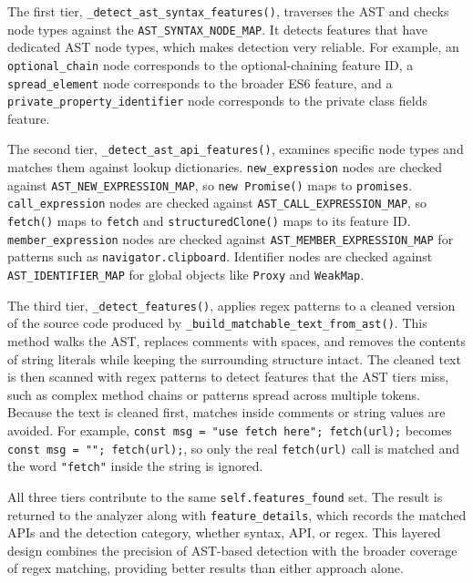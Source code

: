 The first tier, \texttt{\_detect\_ast\_syntax\_features()}, traverses the AST and checks node types against the \texttt{AST\_SYNTAX\_NODE\_MAP}. It detects features that have dedicated AST node types, which makes detection very reliable. For example, an \texttt{optional\_chain} node corresponds to the optional-chaining feature ID, a \texttt{spread\_element} node corresponds to the broader ES6 feature, and a \texttt{private\_property\_identifier} node corresponds to the private class fields feature.

The second tier, \texttt{\_detect\_ast\_api\_features()}, examines specific node types and matches them against lookup dictionaries. \texttt{new\_expression} nodes are checked against \texttt{AST\_NEW\_EXPRESSION\_MAP}, so \texttt{new Promise()} maps to \texttt{promises}. \texttt{call\_expression} nodes are checked against \texttt{AST\_CALL\_EXPRESSION\_MAP}, so \texttt{fetch()} maps to \texttt{fetch} and \texttt{structuredClone()} maps to its feature ID. \texttt{member\_expression} nodes are checked against \texttt{AST\_MEMBER\_EXPRESSION\_MAP} for patterns such as \texttt{navigator.clipboard}. Identifier nodes are checked against \texttt{AST\_IDENTIFIER\_MAP} for global objects like \texttt{Proxy} and \texttt{WeakMap}.

The third tier, \texttt{\_detect\_features()}, applies regex patterns to a cleaned version of the source code produced by \texttt{\_build\_matchable\_text\_from\_ast()}. This method walks the AST, replaces comments with spaces, and removes the contents of string literals while keeping the surrounding structure intact. The cleaned text is then scanned with regex patterns to detect features that the AST tiers miss, such as complex method chains or patterns spread across multiple tokens. Because the text is cleaned first, matches inside comments or string values are avoided. For example, \texttt{const msg = "use fetch here"; fetch(url);} becomes \texttt{const msg = ""; fetch(url);}, so only the real \texttt{fetch(url)} call is matched and the word \texttt{"fetch"} inside the string is ignored.

All three tiers contribute to the same \texttt{self.features\_found} set. The result is returned to the analyzer along with \texttt{feature\_details}, which records the matched APIs and the detection category, whether syntax, API, or regex. This layered design combines the precision of AST-based detection with the broader coverage of regex matching, providing better results than either approach alone.


